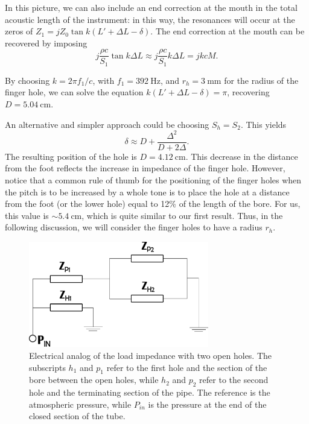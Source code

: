 \documentclass[a4paper]{article}
\begin{document}
In this picture, we can also include an end correction at the mouth in the total acoustic length of the instrument: in this way, the resonances will occur at the zeros of $Z_1 = jZ_0 \tan k(L' + \Delta L - \delta)$. The end correction at the mouth can be recovered by imposing $$j \frac{\rho c}{S_1} \tan k\Delta L \approx j \frac{\rho c}{S_1} k\Delta L = jkcM. $$

By choosing $k = 2\pi f_1/c$, with $f_1 = 392~\si{\hertz}$, and $r_h = 3~\si{\milli\meter}$ for the radius of the finger hole, we can solve the equation $k(L' + \Delta L - \delta) = \pi$, recovering $D = 5.04~\si{\centi\meter}.$

An alternative and simpler approach could be choosing $S_h = S_2$. This yields $$ \delta \approx D + \frac{\Delta^2}{D +2\Delta}.$$ The resulting position of the hole is $D = 4.12~\si{\centi\meter}$. This decrease in the distance from the foot reflects the increase in impedance of the finger hole. However, notice that a common rule of thumb for the positioning of the finger holes when the pitch is to be increased by a whole tone is to place the hole at a distance from the foot (or the lower hole) equal to 12\% of the length of the bore. For us, this value is $\sim 5.4~\si{\centi\meter}$, which is quite similar to our first result. Thus, in the following discussion, we will consider the finger holes to have a radius $r_h$.

\begin{figure}
	\centering
	\includegraphics[width=0.7\textwidth]{twoholes.pdf}
	\caption{Electrical analog of the load impedance with two open holes. The subscripts $h_1$ and $p_1$ refer to the first hole and the section of the bore between the open holes, while $h_2$ and $p_2$ refer to the second hole and the terminating section of the pipe. The reference is the atmospheric pressure, while $P_{in}$ is the pressure at the end of the closed section of the tube.}
	\label{fig:holes}
\end{figure}
\end{document}
